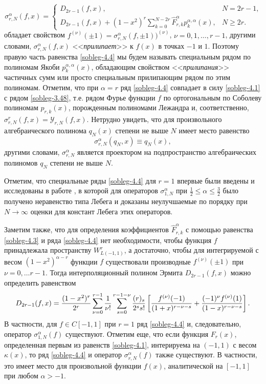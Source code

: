\begin{equation}\label{sobleg-4.5}
 \sigma_{r,N}^\alpha(f,x)=
 \begin{cases}
  D_{2r-1}(f,x),&\text{$N=2r-1$,}\\
 D_{2r-1}(f,x)+(1-x^2)^r \sum_{k=0}^{N-2r} \hat F^\alpha_{r,k}p_{k}^{\alpha,\alpha}(x),&\text{$N\ge 2r$.}
 \end{cases}
\end{equation}
обладает свойством $f^{(\nu)}(\pm1)=\sigma_{r,N}^\alpha(f,\pm1))^{(\nu)}$, $\nu=0,1,\ldots, r-1$, другими словами, $\sigma_{r,N}^\alpha(f,x)$ <<\textit{прилипает}>> к $f(x)$ в точках $-1$ и $1$. Поэтому правую часть  равенства \eqref{sobleg-4.4} мы будем называть специальным рядом по полиномам Якоби $p_{k}^{\alpha,\alpha}(x)$, обладающим свойством <<\textit{прилипания}>> частичных сумм или просто специальным прилипающим рядом по этим  полиномам.  Отметим, что при $\alpha=r$ ряд \eqref{sobleg-4.4} совпадает в силу \eqref{sobleg-4.1} с рядом \eqref{sobleg-3.48}, т.е. рядом Фурье функции $f$ по ортогональным по Соболеву полиномам $p_{r,k}(x)$, порожденным полиномами Лежандра и, соответственно, $\sigma_{r,N}^r(f,x)=\mathcal{ Y}_{r,N}(f,x)$. Нетрудно увидеть, что для произвольного алгебраического полинома $q_N(x)$ степени не выше $N$ имеет место равенство
\begin{equation}\label{sobleg-4.6}
\sigma_{r,N}^\alpha(q_N,x)\equiv q_N(x),
\end{equation}
другими словами, $\sigma_{r,N}^\alpha$ является проектором на подпространство алгебраических полиномов $q_N$ степени не выше $N$.

Отметим, что специальные ряды \eqref{sobleg-4.4} для $r=1$ впервые были введены и исследованы в работе \cite{sharap3}, в которой для операторов $\sigma_{1,N}^\alpha$  при $\frac12\le \alpha\le\frac32$ было получено неравенство типа Лебега и доказаны неулучшаемые по порядку при $N\to\infty$ оценки для констант Лебега этих операторов.

Заметим также, что для определения коэффициентов $\hat F^\alpha_{r,k}$  с помощью равенства \eqref{sobleg-4.3} и ряда \eqref{sobleg-4.4} нет необходимости, чтобы функция $f$ принадлежала пространству $W^r_{L(-1,1)}$, а достаточно, чтобы для интегрируемой с весом $(1-x^2)^{\alpha-r}$ функции $f$ существовали производные $f^{(\nu)}(\pm1)$ при $\nu=0,\ldots r-1$. Тогда  интерполяционный полином Эрмита $D_{2r-1}(f,x)$ можно определить равенством
\begin{equation}\label{sobleg-4.7}
D_{2r-1}(f,x)=
{(1-x^2)^r\over2^r}\sum_{\nu=0}^{r-1}{1\over\nu!}
\sum_{s=0}^{r-1-\nu}{(r)_s\over2^ss!}\left[{f^{(\nu)}(-1)\over(1+x)^{r-\nu-s}}+
{(-1)^\nu f^{(\nu)}(1)\over(1-x)^{r-\nu-s}}\right].
\end{equation}
В частности, для $f\in C[-1,1]$ при $r=1$ ряд \eqref{sobleg-4.4} и, следовательно,  оператор $\sigma_{1,N}^\alpha(f)$ существуют. Отметим еще, что если функция $F_r(x)$, определенная первым из равенств \eqref{sobleg-4.1}, интерируема на $(-1,1)$ с весом $\kappa(x)$, то ряд \eqref{sobleg-4.4} и оператор $\sigma_{r,N}^\alpha(f)$ также существуют. В частности, это имеет место для  произвольной функции $f(x)$, аналитической на $[-1,1]$ при любом $\alpha>-1$.





